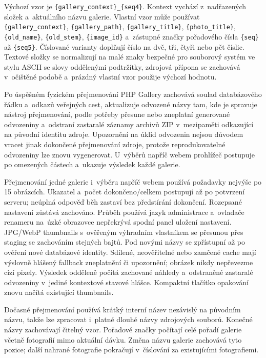 \documentclass[11pt,a4paper]{article}
\newcommand{\codeword}[1]{\nolinkurl{#1}}
\begin{document}
Výchozí vzor je \codeword{\{gallery_context\}_\{seq4\}}. Kontext vychází
z~nadřazených složek a~aktuálního názvu galerie. Vlastní vzor může používat
\codeword{\{gallery_context\}}, \codeword{\{gallery_path\}},
\codeword{\{gallery_title\}},
\codeword{\{photo_title\}}, \codeword{\{old_name\}}, \codeword{\{old_stem\}},
\codeword{\{image_id\}} a~zástupné značky pořadového čísla \codeword{\{seq\}} až
\codeword{\{seq5\}}. Číslované varianty doplňují číslo na dvě, tři, čtyři nebo
pět číslic. Textové složky se normalizují na malé znaky bezpečné pro souborový
systém ve stylu ASCII se slovy oddělenými podtržítky, zdrojová přípona se
zachovává v~očištěné podobě a~prázdný vlastní vzor použije výchozí hodnotu.

Po úspěšném fyzickém přejmenování PHP Gallery zachovává soulad databázového
řádku a~odkazů veřejných cest, aktualizuje odvozené názvy tam, kde je spravuje
nástroj přejmenování, podle potřeby přesune nebo zneplatní generované odvozeniny
a~odstraní zastaralé záznamy archivů ZIP v~mezipaměti odkazující na původní
identitu zdroje. Upozornění na úklid odvozenin nejsou důvodem vracet jinak
dokončené přejmenování zdroje, protože reprodukovatelné odvozeniny lze znovu
vygenerovat. U~výběrů napříč webem prohlížeč postupuje po omezených částech
a~ukazuje výsledek každé galerie.

Přejmenování jedné galerie i~výběru napříč webem používá požadavky nejvýše
po 15 obrázcích. Ukazatel a~počet dokončeno/celkem postupují až po potvrzení
serveru; neúplná odpověď běh zastaví bez předstírání dokončení. Rozepsané
nastavení zůstává zachováno. Průběh používá jazyk administrace a~ovladače
renameru na~úzké obrazovce nepřekrývá spodní panel uložení nastavení.
JPG/WebP thumbnails s~ověřeným výhradním vlastníkem se přesunou přes staging
se zachováním stejných bajtů. Pod novými názvy se
zpřístupní až po ověření nové databázové identity. Sdílené, neověřitelné nebo
zamčené cache mají výslovně hlášený fallback zneplatnění či upozornění;
obrázek nikdy nepřevezme cizí pixely. Výsledek odděleně počítá zachované náhledy
a~odstraněné zastaralé odvozeniny v~jediné kontextové stavové hlášce.
Kompaktní tlačítko opakování znovu načítá
existující thumbnails.

Dočasné přejmenování používá krátký interní název nezávislý na původním názvu,
takže lze zpracovat i~platné dlouhé názvy zdrojových souborů. Konečné názvy
zachovávají čitelný vzor. Pořadové značky počítají celé pořadí galerie včetně
fotografií mimo aktuální dávku. Změna názvu galerie zachovává tyto pozice;
další nahrané fotografie pokračují v~číslování za existujícími fotografiemi.
\end{document}
